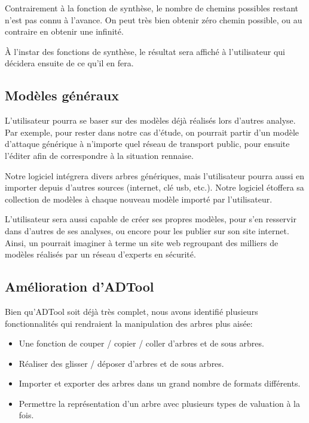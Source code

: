         Contrairement à la fonction de synthèse, le nombre de chemins possibles restant n'est pas connu à l'avance. On peut très bien obtenir zéro chemin possible, ou au contraire en obtenir une infinité.

        \`A l'instar des fonctions de synthèse, le résultat sera affiché à l'utilisateur qui décidera ensuite de ce qu'il en fera.

    \subsection{Modèles généraux}
        \label{sec:modele}

        L'utilisateur pourra se baser sur des modèles déjà réalisés lors d'autres analyse. Par exemple, pour rester dans notre cas d'étude, on pourrait partir d'un modèle d'attaque générique à n'importe quel réseau de transport public, pour ensuite l'éditer afin de correspondre à la situation rennaise.

        Notre logiciel intégrera divers arbres génériques, mais l'utilisateur pourra aussi en importer depuis d'autres sources (internet, clé usb, etc.). Notre logiciel étoffera sa collection de modèles à chaque nouveau modèle importé par l'utilisateur.

        L'utilisateur sera aussi capable de créer ses propres modèles, pour s'en resservir dans d'autres de ses analyses, ou encore pour les publier sur son site internet. Ainsi, un pourrait imaginer à terme un site web regroupant des milliers de modèles réalisés par un réseau d'experts en sécurité.

    \subsection{Amélioration d'ADTool}
        \label{sec:adtoolpp}

        Bien qu'ADTool soit déjà très complet, nous avons identifié plusieurs fonctionnalités qui rendraient la manipulation des arbres plus aisée:
        \begin{itemize}
            \item Une fonction de couper / copier / coller d'arbres et de sous arbres.
            \item Réaliser des glisser / déposer d'arbres et de sous arbres.
            \item Importer et exporter des arbres dans un grand nombre de formats différents.
            \item Permettre la représentation d'un arbre avec plusieurs types de valuation à la fois.
        \end{itemize}

